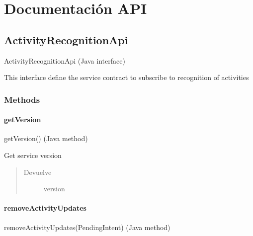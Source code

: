 
\chapter{Documentación API}

\section{ActivityRecognitionApi}
\label{org/hardroid/api/ActivityRecognitionApi:activityrecognitionapi}\label{org/hardroid/api/ActivityRecognitionApi::doc}ActivityRecognitionApi (Java interface)

\begin{fulllineitems}
\label{org/hardroid/api/ActivityRecognitionApi:org.hardroid.api.ActivityRecognitionApi} \par
This interface define the service contract to subscribe to recognition of activities
\end{fulllineitems}



\subsection{Methods}
\label{org/hardroid/api/ActivityRecognitionApi:methods}

\subsubsection{getVersion}
\label{org/hardroid/api/ActivityRecognitionApi:getversion}getVersion() (Java method)

\begin{fulllineitems}
\label{org/hardroid/api/ActivityRecognitionApi:org.hardroid.api.ActivityRecognitionApi.getVersion()} \par
Get service version
\begin{quote}\begin{description}
\item[{Devuelve}] \leavevmode
version

\end{description}\end{quote}

\end{fulllineitems}



\subsubsection{removeActivityUpdates}
\label{org/hardroid/api/ActivityRecognitionApi:removeactivityupdates}removeActivityUpdates(PendingIntent) (Java method)

